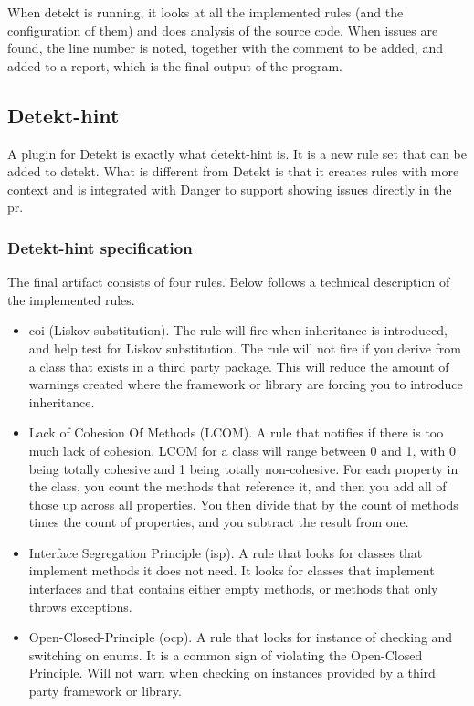 \documentclass{report}
\begin{document}
When detekt is running, it looks at all the implemented rules (and the configuration of them) and does analysis of the source code. When issues are found, the line number is noted, together with the comment to be added, and added to a report, which is the final output of the program. 

\subsection{Detekt-hint}
A plugin for Detekt is exactly what detekt-hint is. It is a new rule set that can be added to detekt. What is different from Detekt is that it creates rules with more context and is integrated with Danger to support showing issues directly in the \gls{pr}.

\subsubsection{Detekt-hint specification}
The final artifact consists of four rules. Below follows a technical description of the implemented rules.
\begin{itemize}
    \item\gls{coi} (Liskov substitution). The rule will fire when inheritance is introduced, and help test for Liskov substitution. The rule will not fire if you derive from a class that exists in a third party package. This will reduce the amount of warnings created where the framework or library are forcing you to introduce inheritance.         
    \item Lack of Cohesion Of Methods (LCOM). A rule that notifies if there is too much lack of cohesion. LCOM for a class will range between 0 and 1, with 0 being totally cohesive and 1 being totally non-cohesive. For each property in the class, you count the methods that reference it, and then you add all of those up across all properties. You then divide that by the count of methods times the count of properties, and you subtract the result from one\cite{}.
    \item Interface Segregation Principle (\gls{isp}). A rule that looks for classes that implement methods it does not need. It looks for classes that implement interfaces and that contains either empty methods, or methods that only throws exceptions.
    \item Open-Closed-Principle (\gls{ocp}). A rule that looks for instance of checking and switching on enums. It is a common sign of violating the Open-Closed Principle. Will not warn when checking on instances provided by a third party framework or library.
\end{itemize}
\end{document}
